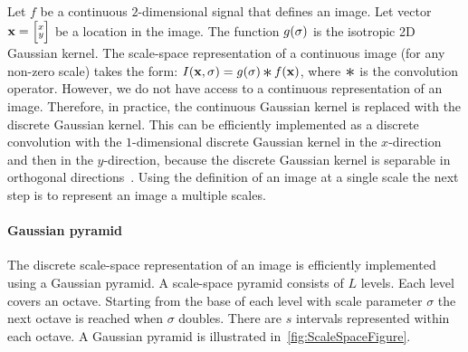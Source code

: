         Let $f$ be a continuous $2$-dimensional signal that defines an image. Let vector $\mathbf{x}= \Bigl[\negthinspace \begin{smallmatrix}  x\\ y \end{smallmatrix} \negthinspace \Bigr] $ be a
        location in the image. The function $g(\sigma)$
        is the isotropic 2D Gaussian kernel. The scale-space representation of a continuous image (for any non-zero
        scale) takes the form: $\img(\pt, \scale) = g(\scale) \conv f(\pt)$, where $\conv$ is the convolution
        operator. However, we do not have access to a continuous representation of an image. Therefore, in
        practice, the continuous Gaussian kernel is replaced with the discrete Gaussian kernel. This can be
        efficiently implemented as a discrete convolution with the $1$-dimensional discrete Gaussian kernel in the
        $x$-direction and then in the $y$-direction, because the discrete Gaussian kernel is separable in
        orthogonal directions~\cite{lindeberg_scale_space_1993}. Using the definition of an image at a single scale
        the next step is to represent an image a multiple scales.




       \paragraph{Gaussian pyramid}

           \newcommand{\downsamp}[2]{#1[::\tightpad#2,::\tightpad#2]}
            The discrete scale-space representation of an image is efficiently implemented using a Gaussian
            pyramid. A scale-space pyramid consists of $L$ levels. Each level covers an octave. Starting from the
            base of each level with scale parameter $\sigma$ the next octave is reached when $\sigma$ doubles.
            There are $s$ intervals represented within each octave. A Gaussian pyramid is illustrated
            in~\cref{fig:ScaleSpaceFigure}.

